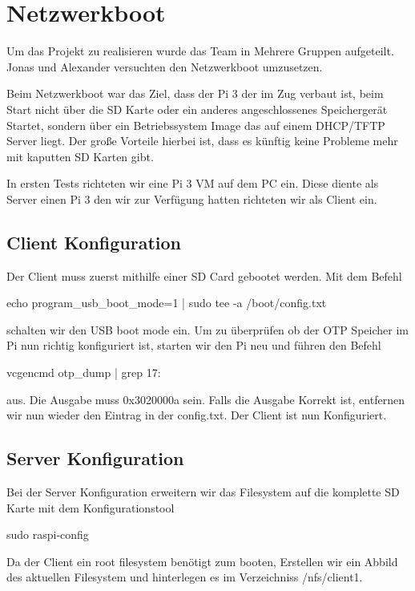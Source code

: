 \documentclass [a4paper,10pt] {article}
\begin{document}
\newpage
	\section{Netzwerkboot}	
		
		Um das Projekt zu realisieren wurde das Team in Mehrere Gruppen aufgeteilt. Jonas und Alexander versuchten den Netzwerkboot umzusetzen.
		
		Beim Netzwerkboot war das Ziel, dass der Pi 3 der im Zug verbaut ist, beim Start nicht über die SD Karte oder ein anderes angeschlossenes Speichergerät Startet, sondern über ein Betriebssystem Image das auf einem DHCP/TFTP Server liegt.
		Der große Vorteile hierbei ist, dass es künftig keine Probleme mehr mit kaputten SD Karten gibt.
		
		In ersten Tests richteten wir eine Pi 3 VM auf dem PC ein. Diese diente als Server einen Pi 3 den wir zur Verfügung hatten richteten wir als Client ein. 
		
		\subsection{Client Konfiguration}
		
			Der Client muss zuerst mithilfe einer SD Card gebootet werden. Mit dem Befehl
			
				echo program\_usb\_boot\_mode=1 | sudo tee -a /boot/config.txt
			
			schalten wir den USB boot mode ein. Um zu überprüfen ob der OTP Speicher im Pi nun richtig konfiguriert ist, starten wir den Pi neu und führen den Befehl
			
				vcgencmd otp\_dump | grep 17:
			
			aus. Die Ausgabe muss 0x3020000a sein. Falls die Ausgabe Korrekt ist, entfernen wir nun wieder den Eintrag in der config.txt. Der Client ist nun Konfiguriert. 
			
		\vfill
		
		\subsection{Server Konfiguration}
		
			Bei der Server Konfiguration erweitern wir das Filesystem auf die komplette SD Karte mit dem Konfigurationstool 
			
			sudo raspi-config
			
			Da der Client ein root filesystem benötigt zum booten, Erstellen wir ein Abbild des aktuellen Filesystem und hinterlegen es im Verzeichniss /nfs/client1.
			 
\end{document}
